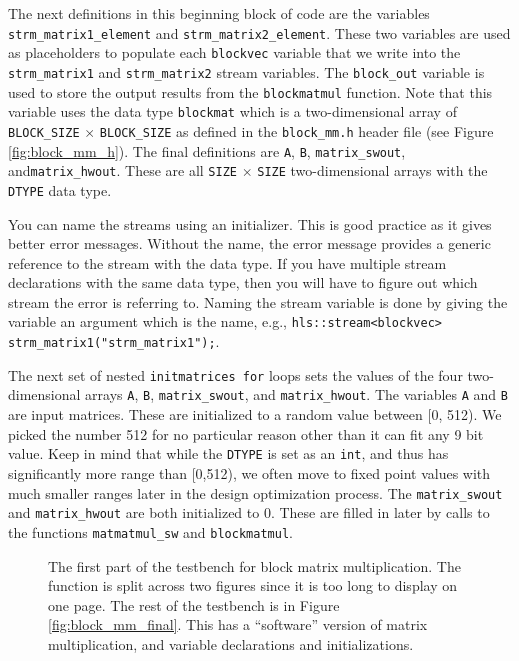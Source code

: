 The next definitions in this beginning block of code are the variables \lstinline{strm_matrix1_element} and \lstinline{strm_matrix2_element}. These two variables are used as placeholders to populate each \lstinline{blockvec} variable that we write into the \lstinline{strm_matrix1} and \lstinline{strm_matrix2} stream variables. The \lstinline{block_out} variable is used to store the output results from the \lstinline{blockmatmul} function. Note that this variable uses the data type \lstinline{blockmat} which is a two-dimensional array of \lstinline{BLOCK_SIZE} $\times$ \lstinline{BLOCK_SIZE} as defined in the \lstinline{block_mm.h} header file (see Figure \ref{fig:block_mm_h}). The final definitions are \lstinline{A},  \lstinline{B},  \lstinline{matrix_swout},  and\lstinline{matrix_hwout}. These are all \lstinline{SIZE} $\times$ \lstinline{SIZE} two-dimensional arrays with the \lstinline{DTYPE} data type. 

\begin{aside}
You can name the streams using an initializer. This is good practice as it gives better error messages. Without the name, the error message provides a generic reference to the stream with the data type. If you have multiple stream declarations with the same data type, then you will have to figure out which stream the error is referring to. Naming the stream variable is done by giving the variable an argument which is the name, e.g., \lstinline{hls::stream<blockvec> strm_matrix1("strm_matrix1");}.
\end{aside}

The next set of nested \lstinline{initmatrices for} loops sets the values of the four two-dimensional arrays \lstinline{A}, \lstinline{B}, \lstinline{matrix_swout}, and \lstinline{matrix_hwout}. The variables \lstinline{A} and \lstinline{B} are input matrices. These are initialized to a random value between [0, 512). We picked the number 512 for no particular reason other than it can fit any 9 bit value. Keep in mind that while the \lstinline{DTYPE} is set as an \lstinline{int}, and thus has significantly more range than [0,512), we often move to fixed point values with much smaller ranges later in the design optimization process. The \lstinline{matrix_swout} and \lstinline{matrix_hwout} are both initialized to $0$. These are filled in later by calls to the functions \lstinline{matmatmul_sw} and \lstinline{blockmatmul}.

\begin{figure}
{\tiny }
\caption{  The first part of the testbench for block matrix multiplication. The function is split across two figures since it is too long to display on one page. The rest of the testbench is in Figure \ref{fig:block_mm_final}. This has a ``software'' version of matrix multiplication, and variable declarations and initializations. }
\label{fig:block_mm_init}
\end{figure}

